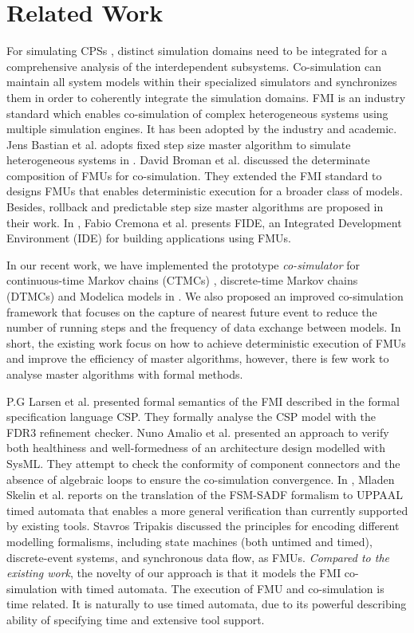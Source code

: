 \section{Related Work}
\label{sec:relateworks}
For simulating CPSs \cite{GeorgMRW14}, distinct
simulation domains need to be integrated for a comprehensive
analysis of the interdependent subsystems. Co-simulation \cite{Bogomolov2015Co} can maintain all system models within their specialized simulators
and synchronizes them in order to coherently integrate the simulation domains. FMI \cite{Blochwitz2011The}\cite{FMI2INTRO} is an industry standard which enables co-simulation of complex heterogeneous systems using multiple simulation engines. It has been adopted by the industry and academic. Jens Bastian et al. adopts fixed step size master algorithm to simulate heterogeneous
systems in \cite{Bastian2011Master}.
David Broman et al. discussed the determinate composition of FMUs for co-simulation. They extended the FMI standard to designs FMUs that enables deterministic execution for a broader class of models. Besides, rollback and predictable step size master algorithms are proposed in their work. In \cite{CremonaLTBL16}, Fabio Cremona et al. presents FIDE, an Integrated Development Environment
(IDE) for building applications using FMUs. 

In our recent work, we have implemented the prototype \textit{co-simulator} for continuous-time Markov chains (CTMCs) \cite{DanosHGS17}, discrete-time Markov chains (DTMCs) \cite{Guerry13} and Modelica models in \cite{LiuJWCD16}. We also proposed an improved co-simulation framework that focuses on the capture of nearest future event to reduce the number of running steps and the frequency of data exchange between models. In short, the existing work focus on how to achieve deterministic execution of FMUs and improve the efficiency of master algorithms, however, there is few work to analyse master algorithms with formal methods.

P.G Larsen et al. \cite{Larsen2016Integrated} presented formal semantics of the FMI described in the formal specification language CSP. They 
formally analyse the CSP model with the FDR3 refinement checker. Nuno Amalio et al. \cite{AmalioPCW16} presented an approach to verify both healthiness and well-formedness of an architecture design modelled with SysML. They attempt to check the conformity of component connectors and the absence of algebraic loops to ensure the co-simulation convergence.
In \cite{SkelinWOHL15}, Mladen Skelin et al. reports on the translation of the FSM-SADF formalism to UPPAAL timed automata that enables a more general
verification than currently supported by existing tools. Stavros Tripakis \cite{Tripakis15} discussed the principles for encoding different modelling formalisms, including state machines (both untimed and timed), discrete-event systems, and synchronous data flow, as FMUs. 
\emph{Compared to the existing work}, the novelty of our approach is that it models the FMI co-simulation with timed automata. The execution of FMU and co-simulation is time related. It is naturally to use timed automata, due to its powerful describing ability of specifying time and extensive tool support.


